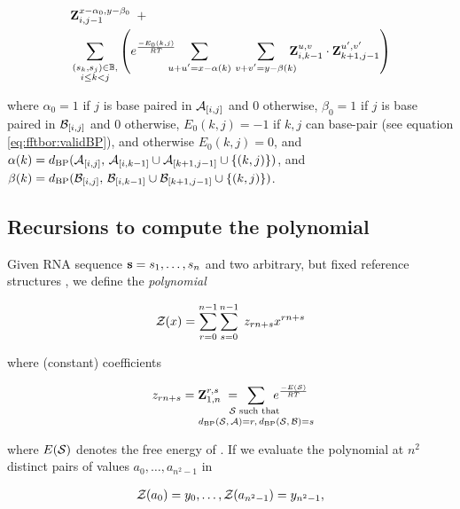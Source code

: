 \begin{align}
\label{eq:ffttwo:bfZabij}
\begin{split}
& \bfZ{x-\alpha_0,y-\beta_0}{i,j-1}\enspace + \\
& \sum_{\substack{(s_k,s_j) \in \bpSet, \\ i \le k<j}}
\left(
\boltzNuss{k,j}\quad
\sum_{\mathclap{u+u'=x-\alpha(k)}}\hspace{3.75em}
\sum_{\mathclap{v+v'=y-\beta(k)}}\quad
\bfZ{u,v}{i,k-1} \cdot \bfZ{u',v'}{k+1,j-1}
\right)
\end{split}
\end{align}

where $\alpha_0 = 1$ if $j$ is base paired in $\mathcal A_{[i,j]}$ and $0$ otherwise,
$\beta_0 = 1$ if $j$ is base paired in $\mathcal B_{[i,j]}$ and $0$ otherwise,
$E_0(k,j)=-1$ if $k,j$ can base-pair
(see equation \ref{eq:fftbor:validBP}), and otherwise $E_0(k,j)=0$, and
$\alpha(k) =
d_{\text{BP}}(\mathcal A_{[i,j]},\,\mathcal A_{[i,k-1]} \cup \mathcal A_{[k+1,j-1]} \cup \{ (k,j) \})$,
and
$\beta(k) =
d_{\text{BP}}(\mathcal B_{[i,j]},\,\mathcal B_{[i,k-1]} \cup \mathcal B_{[k+1,j-1]} \cup \{ (k,j) \})$.

\subsection{Recursions to compute the polynomial
\texorpdfstring{}{}}
\label{subsec:ffttwo:polynomial}

Given RNA sequence ${\bf s} = s_1,\dots,s_n$
and two arbitrary, but fixed reference
structures \strAB, we define the {\em polynomial}

\begin{align}
\label{eq:ffttwo:zOfX}
\fullZx = \sum_{r=0}^{n-1} \sum_{s=0}^{n-1}\; z_{rn+s} x^{rn+s}
\end{align}

where (constant) coefficients

\begin{align}
z_{rn+s} = \bfZ{r,s}{1,n}\;=
\enspace\sum_{\mathclap{\substack{
\str \text{ such that } \rule[-.5ex]{0pt}{0pt} \\
\dBP{\str}{\strA} = r,\,\dBP{\str}{\strB} = s
}}}\enspace
\boltzF{\str}
\end{align}

where $E(\mathcal S)$ denotes the free energy of \str.
If we evaluate the polynomial \fullZx at $n^2$ distinct pairs of values
$a_0,\dots,a_{n^2-1}$ in

\begin{align}
\label{eq:ffttwo:solutionsForAlpha}
\emZof{}{a_0} = y_{0}, \dots, \emZof{}{a_{n^2-1}} = y_{n^2-1},
\end{align}

